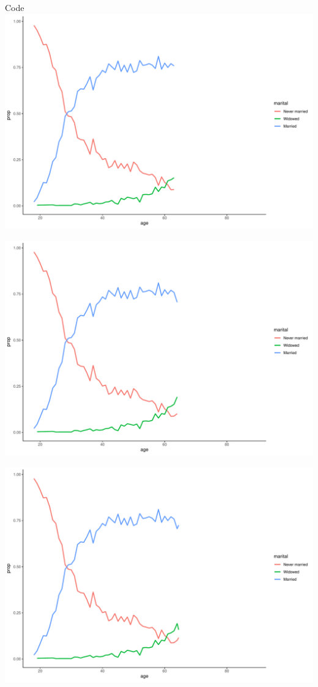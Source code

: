 \documentclass[
  ignorenonframetext,
]{beamer}
\begin{document}
\begin{frame}[fragile]{Code}
\includegraphics{gss_cat_files/figure-beamer/unnamed-chunk-1-68.pdf}

\includegraphics{gss_cat_files/figure-beamer/unnamed-chunk-1-69.pdf}

\includegraphics{gss_cat_files/figure-beamer/unnamed-chunk-1-70.pdf}


\end{frame}
\end{document}
